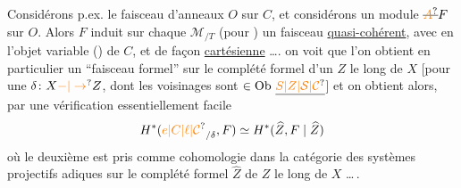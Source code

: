 Considérons p.ex.  le faisceau d'anneaux
 $O$ sur $C$, et considérons un
module $\deleted{\unsure{A}}F$  sur $O$. 
 Alors $F$ induit sur chaque
$\mathcal M_{/T}$ (pour
) un faisceau \uline{quasi-cohérent},
avec  en l'objet variable ()
de $C$, et de façon \uline{cartésienne} \ldots. 
on voit que l'on obtient en particulier
un ``faisceau formel'' sur le
complété formel d'un  $Z$ le long de
$X$ [pour une  $\delta\colon X\unsure{-|\to} Z$, dont
les voisinages  sont $\in\operatorname{Ob}\,\underline{\unsure{S|Z|\mathcal S|\mathcal C}}$] et on
obtient alors, par une vérification essentiellement
facile
\[
H^*(\unsure{e|C|\ell|\mathcal C}_{/\delta},F)\simeq H^*(\widehat Z,F\mid\widehat Z)
\]
où le deuxième  est pris comme
cohomologie dans la catégorie des systèmes
projectifs adiques sur le complété formel
$\widehat Z$ de $Z$ le long de $X$ \ldots\,.

